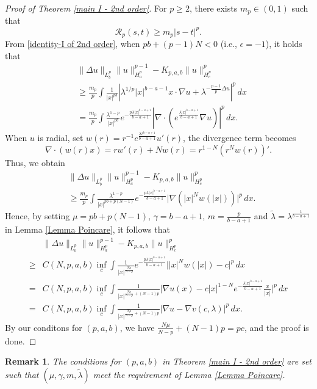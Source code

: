 \documentclass[11pt]{article}
\newtheorem{remark}[theorem]{Remark}
\numberwithin{equation}{section}
\begin{document}
\begin{proof}[Proof of Theorem \ref{main I - 2nd order}]
    For $p \ge 2$, there exists $m_p\in(0,1)$ such that
    \[ \mathcal{R}_p(s,t) \ge m_p|s-t|^p.\]
    From \eqref{identity-I of 2nd order}, when $pb+(p-1)N<0$ (i.e., $\epsilon=-1$), it holds that
    \begin{equation*}
        \begin{aligned}
            & \|\Delta u\|_{L_b^p}\|u\|_{H_a^p}^{p-1} - K_{p,a,b}\|u\|_{H_c^p}^p \\
           &   \ge{} \frac{m_p}{p}\int \frac{1}{|x|^{pb}}\left|\lambda^{1/p}|x|^{b-a-1}x\cdot\nabla u + \lambda^{-\frac{p-1}{p}\Delta u}\right|^p\,dx \\
             & ={} \frac{m_p}{p}\int \frac{\lambda^{1-p}}{|x|^{pb}} e^{-\frac{p\lambda|x|^{b-a+1}}{b-a+1}}\left|\nabla \cdot\left(e^{\frac{\lambda|x|^{b-a+1}}{b-a+1}}\nabla u\right)\right|^p\,dx.
        \end{aligned}
    \end{equation*}
    When $u$ is radial, set $w(r) = r^{-1}e^{\frac{\lambda r^{b-a+1}}{b-a+1}}u'(r)$, the divergence term becomes
    \[ \nabla\cdot(w(r)x) = rw'(r) + Nw(r) = r^{1-N}(r^Nw(r))'. \]
    Thus, we obtain
    \begin{equation*}
        \begin{aligned}
            &\|\Delta u\|_{L_b^p}\|u\|_{H_a^p}^{p-1} - K_{p,a,b}\|u\|_{H_c^p}^p \\
             & \ge{} \frac{m_p}{p}\int\frac{\lambda^{1-p}}{|x|^{pb+p(N-1)}}e^{-\frac{p\lambda|x|^{b-a+1}}{b-a+1}}\Big|\nabla(|x|^Nw(|x|))\Big|^p\,dx.
        \end{aligned}
    \end{equation*}
    Hence, by setting $\mu = pb+p(N-1)$, $\gamma = b-a+1$, $m = \frac{p}{b-a+1}$ and $\tilde{\lambda} = \lambda^{\frac{1}{b-a+1}}$ in Lemma \ref{Lemma Poincare}, it follows that
    \begin{equation*}
        \begin{aligned}
            &\|\Delta u\|_{L_b^p}\|u\|_{H_a^p}^{p-1} - K_{p,a,b}\|u\|_{H_c^p}^p \\
            \ge{}& C(N,p,a,b)\inf_c \int \frac{1}{|x|^{\frac{N\mu}{N-p}}}e^{-\frac{p\lambda|x|^{b-a+1}}{b-a+1}}\Big||x|^Nw(|x|)-c\Big|^p\,dx \\
            ={}& C(N,p,a,b)\inf_c \int \frac{1}{|x|^{\frac{N\mu}{N-p}+(N-1)p}}\Big|\nabla u(x)- c|x|^{1-N}e^{-\frac{\lambda|x|^{b-a+1}}{b-a+1}}\frac{x}{|x|}\Big|^p\,dx \\
            ={}& C(N,p,a,b)\inf_c \int \frac{1}{|x|^{\frac{N\mu}{N-p}+(N-1)p}}|\nabla u - \nabla v(c,\lambda)|^p\,dx.
        \end{aligned}
    \end{equation*}
    By our conditons for $(p,a,b)$, we have $\frac{N\mu}{N-p}+(N-1)p = pc$, and the proof is done.
\end{proof}
\begin{remark}
    The conditions for $(p,a,b)$ in Theorem \ref{main I - 2nd order} are set such that $(\mu,\gamma,m,\tilde{\lambda})$ meet the requirement of Lemma \ref{Lemma Poincare}.
\end{remark}
\end{document}
